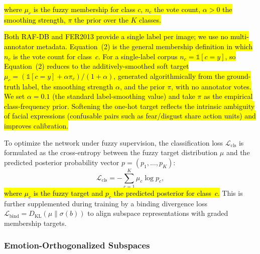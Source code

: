\documentclass[algorithms,article,submit,moreauthors]{Definitions/mdpi}
\newcommand{\rev}[1]{\hl{#1}}
\begin{document}
\rev{where \mbox{$\mu_c$} is the fuzzy membership for class \mbox{$c$},
\mbox{$n_c$} the vote count, \mbox{$\alpha>0$} the smoothing strength,
\mbox{$\pi$} the prior over the \mbox{$K$} classes.}


\rev{Both RAF-DB and FER2013 provide a single label per image; we use no
multi-annotator metadata. Equation~(2) is the general membership definition in
which \mbox{$n_c$} is the vote count for class~\mbox{$c$}. For a single-label
corpus \mbox{$n_c=\mathbb{1}[c=y]$}, so Equation~(2) reduces to the
additively-smoothed soft target \mbox{$\mu_c=(\mathbb{1}[c=y]+\alpha\pi_c)/(1+\alpha)$},
generated algorithmically from the ground-truth label, the smoothing strength
\mbox{$\alpha$}, and the prior \mbox{$\pi$}, with no annotator votes. We set
\mbox{$\alpha=0.1$} (the standard label-smoothing value) and take \mbox{$\pi$} as
the empirical class-frequency prior. Softening the one-hot target reflects the
intrinsic ambiguity of facial expressions (confusable pairs such as fear/disgust
share action units) and improves calibration.}


To optimize the network under fuzzy supervision, the classification loss $\mathcal{L}_{\text{cls}}$ is formulated as the cross-entropy between the fuzzy target distribution $\mu$ and the predicted posterior probability vector $p = (p_1, \dots, p_K)$:
\begin{equation}
\mathcal{L}_{\text{cls}} = -\sum_{c=1}^{K} \mu_c \log p_c,
\label{eq:fuzzy_loss}
\end{equation}
\rev{where \mbox{$\mu_c$} is the fuzzy target and \mbox{$p_c$} the predicted posterior for class~\mbox{$c$}.} This is further supplemented during training by a binding divergence loss $\mathcal{L}_{\text{bind}} = D_{\text{KL}}(\mu \parallel \sigma(b))$ to align subspace representations with graded membership targets.

\subsubsection{Emotion-Orthogonalized Subspaces}
\end{document}
